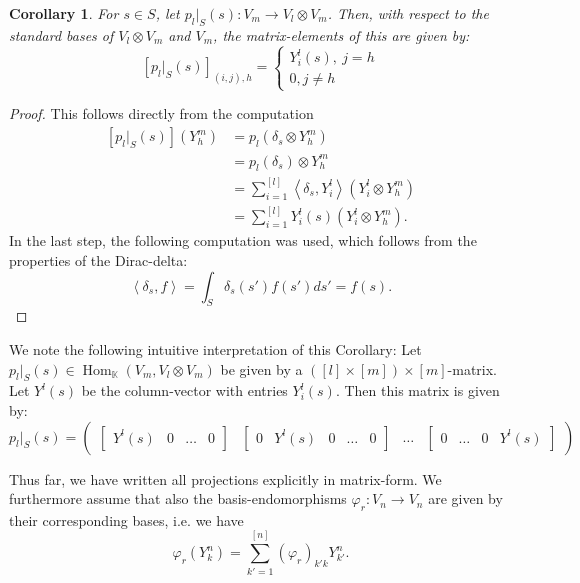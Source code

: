 \documentclass[12pt, a4paper]{article}
\theoremstyle{plain}
\newtheorem{cor}[pro]{Corollary}
\theoremstyle{definition}
\theoremstyle{remark}
\newcommand{\K}{\mathds{K}}
\DeclareMathOperator{\Hom}{Hom}
\begin{document}
\begin{cor}
For $s \in S$, let $p_l|_S(s): V_m \to V_l \otimes V_m$. Then, with respect to the standard bases of $V_l \otimes V_m$ and $V_m$, the matrix-elements of this are given by:
\begin{equation*}
\left[ p_l|_S(s) \right]_{(i,j),h} = \begin{cases}
Y_i^{l}(s), \ j = h \\
0, j \neq h
\end{cases}
\end{equation*}
\end{cor}

\begin{proof}
This follows directly from the computation
\begin{align*}
\left[ p_l|_S(s)\right] (Y_h^{m}) & = p_l(\delta_s \otimes Y_h^m) \\
& = p_l(\delta_s) \otimes Y_h^m \\
& = \sum_{i = 1}^{[l]} \left\langle \delta_s, Y_i^l\right\rangle \left( Y_i^l \otimes Y_h^m \right) \\
& = \sum_{i = 1}^{[l]}Y_i^l(s) \left( Y_i^l \otimes Y_h^m\right).
\end{align*}
In the last step, the following computation was used, which follows from the properties of the Dirac-delta:
\begin{equation*}
\left\langle \delta_s, f \right\rangle = \int_{S} \delta_s(s') f(s') ds' = f(s).
\end{equation*}
\end{proof}

We note the following intuitive interpretation of this Corollary: Let $p_l|_S(s) \in \Hom_\K(V_m, V_l \otimes V_m)$ be given by a $([l] \times [m]) \times [m]$-matrix. Let $Y^l(s)$ be the column-vector with entries $Y^l_i(s)$. Then this matrix is given by:
\begin{equation*}
p_l|_S(s) = \begin{pmatrix}
\begin{bmatrix}
Y^l(s) & 0 & \hdots & 0
\end{bmatrix}
&
\begin{bmatrix}
0 & Y^l(s) & 0 & \hdots & 0
\end{bmatrix}
&
\hdots
&
\begin{bmatrix}
0 & \hdots & 0 & Y^l(s)
\end{bmatrix}
\end{pmatrix}
\end{equation*}

Thus far, we have written all projections explicitly in matrix-form. We furthermore assume that also the basis-endomorphisms $\varphi_r: V_n \to V_n$ are given by their corresponding bases, i.e. we have
\begin{equation*}
\varphi_r(Y^n_k) = \sum_{k' = 1}^{[n]} \left( \varphi_r\right)_{k'k} Y^n_{k'}.
\end{equation*}
\end{document}
